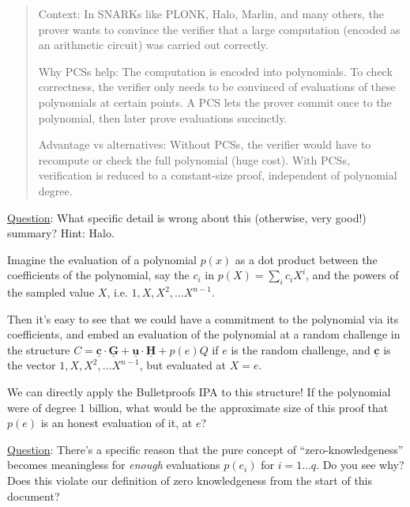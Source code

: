 \documentclass[10pt,a4paper]{article}
\begin{document}
\begin{quotation}
Context: In SNARKs like PLONK, Halo, Marlin, and many others, the prover wants to convince the verifier that a large computation (encoded as an arithmetic circuit) was carried out correctly.

Why PCSs help:
The computation is encoded into polynomials. To check correctness, the verifier only needs to be convinced of evaluations of these polynomials at certain points.
A PCS lets the prover commit once to the polynomial, then later prove evaluations succinctly.

Advantage vs alternatives: Without PCSs, the verifier would have to recompute or check the full polynomial (huge cost). With PCSs, verification is reduced to a constant-size proof, independent of polynomial degree.
\end{quotation}

\underline{Question}: What specific detail is wrong about this (otherwise, very good!) summary? Hint: Halo.

\vspace{5 pt}

Imagine the evaluation of a polynomial $p(x)$ as a dot product between the coefficients of the polynomial, say the $c_i$ in $p(X) = \sum_i c_i X^i$, and the powers of the sampled value $X$, i.e. $1, X, X^2, \ldots X^{n-1}$.


\vspace{5 pt}

Then it's easy to see that we could have a commitment to the polynomial via its coefficients, and embed an evaluation of the polynomial at a random challenge in the structure $C = \underline{\textbf{c}} \cdot \underline{\textbf{G}} + \underline{\textbf{u}} \cdot \underline{\textbf{H}} + p(e) Q$ if $e$ is the random challenge, and $\underline{\textbf{c}}$ is the vector $1, X, X^2, \ldots X^{n-1}$, but evaluated at $X=e$.

\vspace{5 pt}

We can directly apply the Bulletproofs IPA to this structure! If the polynomial were of degree 1 billion, what would be the approximate size of this proof that $p(e)$ is an honest evaluation of it, at $e$?

\vspace{5 pt}

\underline{Question}: There's a specific reason that the pure concept of ``zero-knowledgeness'' becomes meaningless for \emph{enough} evaluations $p(e_i)$ for $i = 1 \ldots q$. Do you see why? Does this violate our definition of zero knowledgeness from the start of this document?
\end{document}
